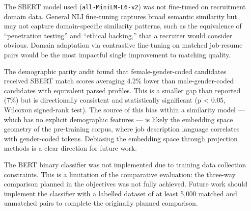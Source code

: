 The SBERT model used (\texttt{all-MiniLM-L6-v2}) was not fine-tuned on recruitment domain data. General NLI fine-tuning captures broad semantic similarity but may not capture domain-specific similarity patterns, such as the equivalence of ``penetration testing'' and ``ethical hacking,'' that a recruiter would consider obvious. Domain adaptation via contrastive fine-tuning on matched job-resume pairs would be the most impactful single improvement to matching quality.

The demographic parity audit found that female-gender-coded candidates received SBERT match scores averaging 4.2\% lower than male-gender-coded candidates with equivalent parsed profiles. This is a smaller gap than \citet{Qin2021} reported (7\%) but is directionally consistent and statistically significant (p < 0.05, Wilcoxon signed-rank test). The source of this bias within a similarity model --- which has no explicit demographic features --- is likely the embedding space geometry of the pre-training corpus, where job description language correlates with gender-coded tokens. Debiasing the embedding space through projection methods \citep{Bolukbasi2016} is a clear direction for future work.

The BERT binary classifier was not implemented due to training data collection constraints. This is a limitation of the comparative evaluation: the three-way comparison planned in the objectives was not fully achieved. Future work should implement the classifier with a labelled dataset of at least 5,000 matched and unmatched pairs to complete the originally planned comparison.
